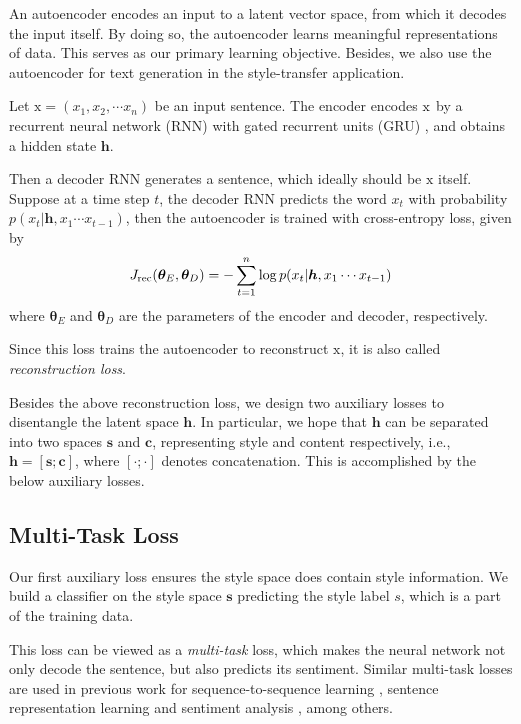 \documentclass[11pt,a4paper]{article}
\newcommand{\rmx}{\mathrm x}
\begin{document}
An autoencoder encodes an input to a latent vector space, from which it decodes the input itself. By doing so, the autoencoder learns meaningful representations of data. This serves as our primary learning objective. Besides, we also use the autoencoder for text generation in the style-transfer application.

Let $\rmx=(x_1, x_2, \cdots x_n)$ be an input sentence. The encoder encodes $\rm x$ by a recurrent neural network (RNN) with gated recurrent units (GRU) \cite{cho2014learning}, and obtains a hidden state $\bm h$.

Then a decoder RNN generates a sentence, which ideally should be $\rmx$ itself. Suppose at a time step $t$, the decoder RNN predicts the word $x_t$ with probability $p(x_t|\bm h, x_1\cdots x_{t-1})$, then the autoencoder is trained with cross-entropy loss, given by
\vspace{-.5cm}
\begin{equation}\nonumber
	J_\text{rec}(\bm\theta_E,\bm\theta_D)= -\sum_{t=1}^n \log
	p(x_t|\bm h, x_1\cdots x_{t-1})
	\vspace{-.3cm}
\end{equation}
where $\bm\theta_E$ and $\bm\theta_D$ are the parameters of the encoder and decoder, respectively.

Since this loss trains the autoencoder to reconstruct $\rmx$, it is also called \textit{reconstruction loss}.

Besides the above reconstruction loss, we design two auxiliary losses to disentangle the latent space $\bm h$. In particular, we hope that $\bm h$ can be separated into two spaces $\bm s$ and $\bm c$, representing style and content respectively, i.e., $\bm h = [\bm s ; \bm c]$, where $[\cdot;\cdot]$ denotes concatenation. This is accomplished by the below auxiliary losses.

\subsection{Multi-Task Loss} \label{ss:multi}

Our first auxiliary loss ensures the style space does contain style information. We build a classifier on the style space $\bm s$ predicting the style label $s$, which is a part of the training data.

This loss can be viewed as a \textit{multi-task} loss, which makes the neural network not only decode the sentence, but also predicts its sentiment. Similar multi-task losses are used in previous work for sequence-to-sequence learning \cite{luong2015multi}, sentence representation learning \cite{jernite2017discourse} and sentiment analysis \cite{balikas2017multitask}, among others.
\end{document}
